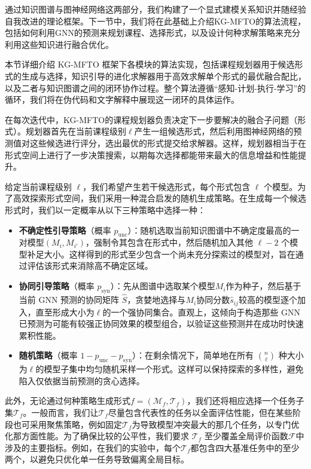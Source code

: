 \documentclass[../main.tex]{subfiles}
\begin{document}
通过知识图谱与图神经网络这两部分，我们构建了一个显式建模关系知识并随经验自我改进的理论框架。下一节中，我们将在此基础上介绍KG-MFTO的算法流程，包括如何利用GNN的预测来规划课程、选择形式，以及设计何种求解策略来充分利用这些知识进行融合优化。

\label{sec:ch5-5-kg-mfto-algorithm-design}

本节详细介绍 KG-MFTO 框架下各模块的算法实现，包括课程规划器用于候选形式的生成与选择，知识引导的进化求解器用于高效求解单个形式的最优融合配比，以及二者与知识图谱之间的闭环协作过程。整个算法遵循“感知-计划-执行-学习”的循环，我们将在伪代码和文字解释中展现这一闭环的具体运作。

\label{sec:ch5-5-1-curriculum-design-and-format}
在每次迭代中，KG-MFTO的课程规划器负责决定下一步要解决的融合子问题（形式）。规划器首先在当前课程级别$\ell$产生一组候选形式，然后利用图神经网络的预测值对这些候选进行评分，选出最优的形式提交给求解器。这样，规划器相当于在形式空间上进行了一步决策搜索，以期每次选择都能带来最大的信息增益和性能提升。


给定当前课程级别 $\ell$，我们希望产生若干候选形式，每个形式包含 $\ell$ 个模型。为了高效探索形式空间，我们采用一种混合启发的随机生成策略。在生成每一个候选形式时，我们以一定概率从以下三种策略中选择一种：

\begin{itemize}[leftmargin=3\ccwd]
	\item \textbf{不确定性引导策略}（概率 $p_{\text{unc}}$）：随机选取当前知识图谱中不确定度最高的一对模型$(M_i, M_{i'})$，强制令其包含在形式中，然后随机加入其他 $\ell-2$ 个模型补足大小。这样得到的形式至少包含一个尚未充分探索过的模型对，旨在通过评估该形式来消除高不确定区域。
	\item \textbf{协同引导策略}（概率 $p_{\text{syn}}$）：先从图谱中选取某个模型$M_i$作为种子，然后基于当前 GNN 预测的协同矩阵 $\hat{S}$，贪婪地选择与$M_i$协同分数$\hat{s}_{ij}$较高的模型逐个加入，直至形成大小为$\ell$的一个强协同集合。直观上，这倾向于构造那些 GNN 已预测为可能有较强正协同效果的模型组合，以验证这些预测并在成功时快速累积性能。
	\item \textbf{随机策略}（概率 $1 - p_{\text{unc}} - p_{\text{syn}}$）：在剩余情况下，简单地在所有 $\binom{n}{\ell}$ 种大小为$\ell$的模型子集中均匀随机采样一个形式。这样可以保持探索的多样性，避免陷入仅依据当前预测的贪心选择。
\end{itemize}

此外，无论通过何种策略生成形式$f=(\mathcal{M}_f,\mathcal{T}_f)$，我们还将相应选择一个任务子集$\mathcal{T}_f$。一般而言，我们让$\mathcal{T}_f$尽量包含代表性的任务以全面评估性能，但在某些阶段也可采用聚焦策略，例如固定$\mathcal{T}_f$为导致模型冲突最大的那几个任务，以专门优化那方面性能。为了确保比较的公平性，我们要求 $\mathcal{T}_f$ 至少覆盖全局评价函数$\mathcal{F}$中涉及的主要指标。例如，在我们的实验中，每个$\mathcal{T}_f$都包含四大基准任务中的至少两个，以避免只优化单一任务导致偏离全局目标。
\end{document}
